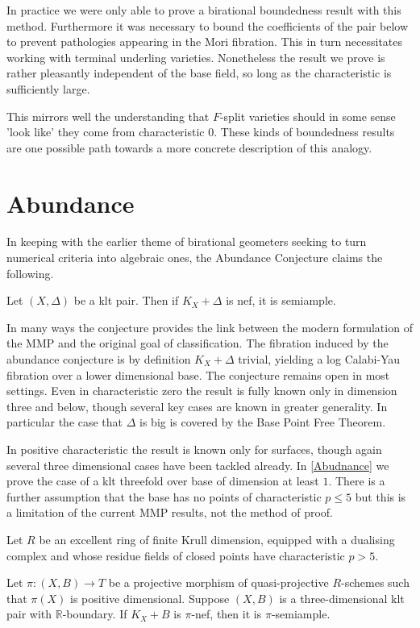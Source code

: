 \documentclass[a4paper,12pt]{book}
\begin{document}
	
	In practice we were only able to prove a birational boundedness result with this method. Furthermore it was necessary to bound the coefficients of the pair below to prevent pathologies appearing in the Mori fibration. This in turn necessitates working with terminal underling varieties. Nonetheless the result we prove is rather pleasantly independent of the base field, so long as the characteristic is sufficiently large.
	
	This mirrors well the understanding that $F$-split varieties should in some sense 'look like' they come from characteristic $0$. These kinds of boundedness results are one possible path towards a more concrete description of this analogy.
	
	\section{Abundance}
	
	In keeping with the earlier theme of birational geometers seeking to turn numerical criteria into algebraic ones, the Abundance Conjecture claims the following.
	
	\begin{conjecture*}
		
		Let $(X,\Delta)$ be a klt pair. Then if $K_{X}+\Delta$ is nef, it is semiample.	
		\end{conjecture*}
	
	In many ways the conjecture provides the link between the modern formulation of the MMP and the original goal of classification. The fibration induced by the abundance conjecture is by definition $K_{X}+\Delta$ trivial, yielding a log Calabi-Yau fibration over a lower dimensional base. The conjecture remains open in most settings. Even in characteristic zero the result is fully known only in dimension three and below, though several key cases are known in greater generality. In particular the case that $\Delta$ is big is covered by the Base Point Free Theorem.
	
	In positive characteristic the result is known only for surfaces, though again several three dimensional cases have been tackled already. In \autoref{Abudnance} we prove the case of a klt threefold over base of dimension at least $1$. There is a further assumption that the base has no points of characteristic $p \leq 5$ but this is a limitation of the current MMP results, not the method of proof.
	
	\begin{theo}\label{Main_Abund1}
		Let $R$ be an excellent ring of finite Krull dimension, equipped with a dualising complex and whose residue fields of closed points have characteristic $p>5$.
		
		Let $\pi \colon (X,B) \to T$ be a projective morphism of quasi-projective $R$-schemes such that $\pi(X)$ is positive dimensional.
		Suppose $(X,B)$ is a three-dimensional klt pair with $\mathbb{R}$-boundary. If $K_X+B$ is $\pi$-nef, then it is $\pi$-semiample.
	\end{theo}
	
\end{document}
